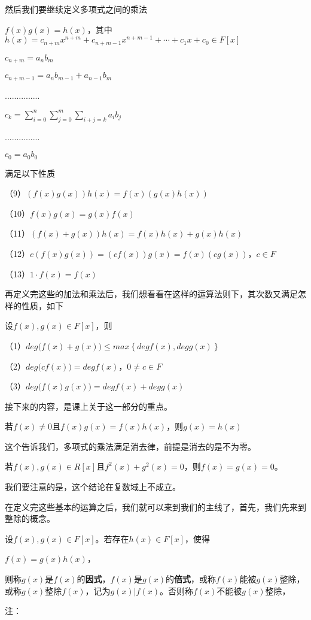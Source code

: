 \documentclass[lang=cn,10pt]{elegantbook}
\begin{document}
然后我们要继续定义多项式之间的乘法
\begin{definition}[乘法]
	$f(x)g(x)=h(x)$，其中
	$h(x)=c_{n+m}x^{n+m}+c_{n+m-1}x^{n+m-1}+\cdots+c_1x+c_0\in F[x]$
	
	$c_{n+m}=a_nb_m$
	
$	c_{n+m-1}=a_nb_{m-1}+a_{n-1}b_m$

	...............
	
	$c_k=\sum_{i=0}^{n}\sum_{j=0}^{m}\sum_{i+j=k}{a_ib_j}$
	
	...............
	
	$c_0=a_0b_0$
\end{definition}
满足以下性质
\begin{conclusion}
	（9）$(f(x)g(x))h(x)=f(x)(g(x)h(x))$
	
	（10）$f(x)g(x)=g(x)f(x)$
	
	（11）$(f(x)+g(x))h(x)=f(x)h(x)+g(x)h(x)$
	
	（12）$c(f(x)g(x))=(cf(x))g(x)=f(x)(cg(x))$，$c\in F$
	
	（13）$1\cdot f(x)=f(x)$	
\end{conclusion}
再定义完这些的加法和乘法后，我们想看看在这样的运算法则下，其次数又满足怎样的性质，如下
\begin{conclusion}
	设$f(x),g(x)\in F[x]$，则
	
	（1）$deg{(}f(x)+g(x))\le m a x{\left\{deg{f}(x),deg{g}(x)\right\}}$
	
	（2）$deg{(}cf(x))=deg{f}(x)$，$0\neq c\in F$
	
	（3）$deg{(}f(x)g(x))=deg{f}(x)+deg{g}(x)$	
\end{conclusion}
接下来的内容，是课上关于这一部分的重点。
\begin{conclusion}
	若$f(x)\neq0$且$f(x)g(x)=f(x)h(x)$，则$g(x)=h(x)$
\end{conclusion}
这个告诉我们，多项式的乘法满足消去律，前提是消去的是不为零。
\begin{conclusion}
	若$f(x),g(x)\in R[x]$且$f^2(x)+g^2(x)=0$，则$f(x)=g(x)=0$。
\end{conclusion}
我们要注意的是，这个结论在复数域上不成立。

在定义完这些基本的运算之后，我们就可以来到我们的主线了，首先，我们先来到整除的概念。
\begin{definition}[整除]
	设$f(x),g(x)\in F[x]$。若存在$h(x)\in F[x]$，使得
	
	$f(x)=g(x)h(x)$，
	
	则称$g(x)$是$f(x)$的\textbf{因式}，$f(x)$是$g(x)$的\textbf{倍式}，或称$f(x)$能被$g(x)$整除，或称$g(x)$整除$f(x)$，记为$g(x)|f(x)$。否则称$f(x)$不能被$g(x)$整除，
\end{definition}
注：
\end{document}
